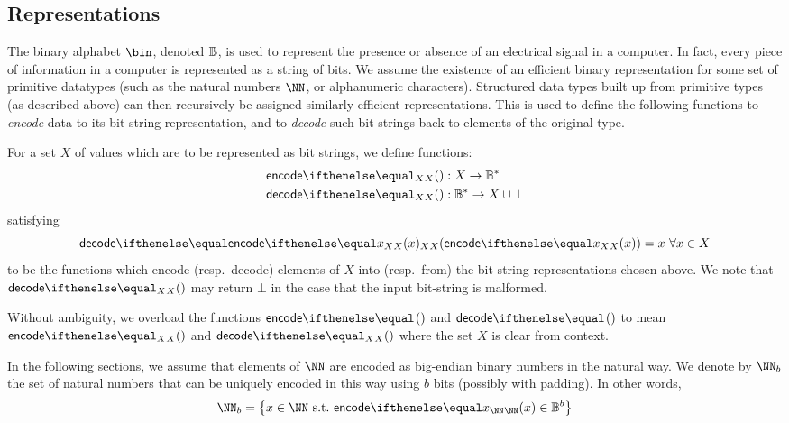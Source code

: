 \subsection{Representations}\label{preliminaries:data-types:representation}

The binary alphabet $\bin$, denoted $\mathbb{B}$, is used to represent the presence or absence of an electrical signal in a computer. In fact, every piece of information in a computer is represented as a string of bits.
We assume the existence of an efficient binary representation for some set of primitive datatypes (such as the natural numbers $\NN$, or alphanumeric characters). Structured data types built up from primitive types (as described above) can then recursively be assigned similarly efficient representations.
This is used to define the following functions to \emph{encode} data to its bit-string representation, and to \emph{decode} such bit-strings back to elements of the original type.

\begin{definition}
  For a set $X$ of values which are to be represented as bit strings, we define functions:
  \begin{align*}
    \encode{}{X} &: X \to \BB^* \\
    \decode{}{X} &: \BB^* \to X \cup \bot
  \end{align*}
  satisfying
  \[
    \decode{\encode{x}{X}}{X} = x\ \forall x \in X
  \]
  to be the functions which encode (resp.~decode) elements of $X$ into (resp.~from) the bit-string representations chosen above.
  We note that $\decode{}{X}$ may return $\bot$ in the case that the input bit-string is malformed.
\end{definition}

Without ambiguity, we overload the functions $\encode{}{}$ and $\decode{}{}$ to mean $\encode{}{X}$ and $\decode{}{X}$ where the set $X$ is clear from context.

In the following sections, we assume that elements of $\NN$ are encoded as big-endian binary numbers in the natural way. We denote by $\NN_{b}$ the set of natural numbers that can be uniquely encoded in this way using $b$ bits (possibly with padding). In other words,
\[
  \NN_{b} = \smallset{x \in \NN\ \suchthat\ \encode{x}{\NN} \in \BB^{b}}
\]
